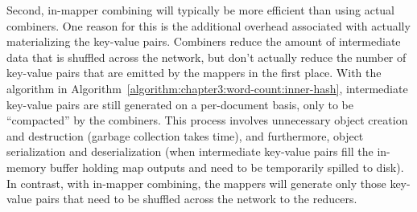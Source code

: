 Second, in-mapper combining will typically be more efficient than
using actual combiners.  One reason for this is the additional
overhead associated with actually materializing the key-value pairs.
Combiners reduce the amount of intermediate data that is shuffled
across the network, but don't actually reduce the number of key-value
pairs that are emitted by the mappers in the first place.  With the
algorithm in Algorithm~\ref{algorithm:chapter3:word-count:inner-hash},
intermediate key-value pairs are still generated on a per-document
basis, only to be ``compacted'' by the combiners.  This process
involves unnecessary object creation and destruction (garbage
collection takes time), and furthermore, object serialization and
deserialization (when intermediate key-value pairs fill the in-memory
buffer holding map outputs and need to be temporarily spilled to
disk). In contrast, with in-mapper combining, the mappers will
generate only those key-value pairs that need to be shuffled across
the network to the reducers.

